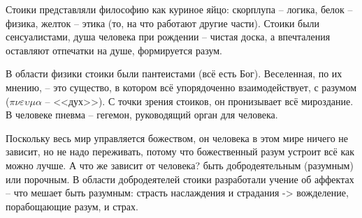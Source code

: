 \documentclass[a4paper, 12pt]{article} %
\begin{document}
Стоики представляли философию как куриное яйцо: скорплупа -- логика, белок -- физика, желток -- этика (то, на что работают другие части). Стоики были сенсуалистами, душа человека при рождении -- чистая доска, а впечталения оставляют отпечатки на душе, формируется разум.

В области физики стоики были пантеистами (всё есть Бог). Веселенная, по их мнению, -- это существо, в котором всё упорядоченно взаимодействует, с разумом ($\pi \nu \varepsilon \upsilon \mu \alpha$ -- <<дух>>). С точки зрения стоиков, он пронизывает всё мироздание. В человеке пневма -- гегемон, руководящий орган для человека. 

Поскольку весь мир управляется божеством, он человека в этом мире ничего не зависит, но не надо переживать, потому что божественный разум устроит всё как можно лучше. А что же зависит от человека? быть добродеятельным (разумным) или порочным. В области добродеятелей стоики разработали учение об аффектах -- что мешает быть разумным: страсть наслаждения и страдания -> вожделение, порабощающие разум, и страх.

	
\end{document}
